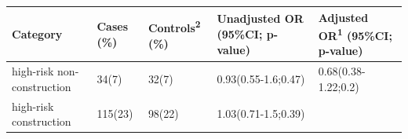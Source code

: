 \begin{longtable}[]{@{}lllll@{}}
\toprule
\begin{minipage}[b]{0.20\columnwidth}\raggedright
Category\strut
\end{minipage} & \begin{minipage}[b]{0.08\columnwidth}\raggedright
Cases (\%)\strut
\end{minipage} & \begin{minipage}[b]{0.10\columnwidth}\raggedright
Controls\textsuperscript{2} (\%)\strut
\end{minipage} & \begin{minipage}[b]{0.24\columnwidth}\raggedright
Unadjusted OR (95\%CI; p-value)\strut
\end{minipage} & \begin{minipage}[b]{0.23\columnwidth}\raggedright
Adjusted OR\textsuperscript{1} (95\%CI; p-value)\strut
\end{minipage}\tabularnewline
\midrule
\endhead
\begin{minipage}[t]{0.20\columnwidth}\raggedright
high-risk non-construction\strut
\end{minipage} & \begin{minipage}[t]{0.08\columnwidth}\raggedright
34(7)\strut
\end{minipage} & \begin{minipage}[t]{0.10\columnwidth}\raggedright
32(7)\strut
\end{minipage} & \begin{minipage}[t]{0.24\columnwidth}\raggedright
0.93(0.55-1.6;0.47)\strut
\end{minipage} & \begin{minipage}[t]{0.23\columnwidth}\raggedright
0.68(0.38-1.22;0.2)\strut
\end{minipage}\tabularnewline
\begin{minipage}[t]{0.20\columnwidth}\raggedright
high-risk construction\strut
\end{minipage} & \begin{minipage}[t]{0.08\columnwidth}\raggedright
115(23)\strut
\end{minipage} & \begin{minipage}[t]{0.10\columnwidth}\raggedright
98(22)\strut
\end{minipage} & \begin{minipage}[t]{0.24\columnwidth}\raggedright
1.03(0.71-1.5;0.39)\strut
\end{minipage} & \begin{minipage}[t]{0.23\columnwidth}\raggedright

\end{minipage}
\end{longtable}

